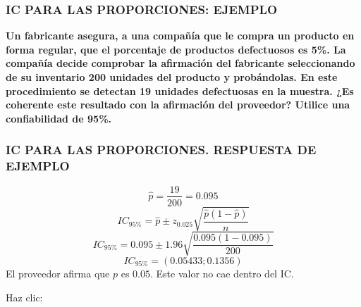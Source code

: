 \documentclass{beamer}
\begin{document}
\begin{frame}
\frametitle{IC PARA LAS PROPORCIONES: EJEMPLO}
\textbf{
Un fabricante asegura, a una compañía que le compra un producto en
forma regular, que el porcentaje de productos defectuosos es 5\%. La compañía decide comprobar la afirmación del
fabricante seleccionando de su inventario 200 unidades del producto
y probándolas. En este procedimiento se detectan 19 unidades
defectuosas en la muestra. ¿Es coherente este resultado con la
afirmación del proveedor? Utilice una confiabilidad de 95\%.
}\end{frame}

\begin{frame}
\frametitle{IC PARA LAS PROPORCIONES. RESPUESTA DE EJEMPLO}

$$\hat{p}=\frac{19}{200}=0.095$$
$$IC_{95\%}=\hat{p}\pm z_{0.025}\sqrt{\frac{\hat{p}(1-\hat{p})}{n}}$$
$$IC_{95\%}=0.095 \pm 1.96 \sqrt{\frac{0.095(1-0.095)}{200}}$$
$$IC_{95\%}=(0.05433;0.1356)$$
El proveedor afirma que $p$ es $0.05$. Este
valor no cae dentro del IC.

      Haz clic: \href{https://colab.research.google.com/drive/14izMe-eFdclOhTeS3hiLE_0h_4E3Jkps?usp=sharing}{}  \href{https://docs.google.com/spreadsheets/d/1xAh-TitIncHH8uwblbpvgjYma7B6gUTWlk8C2z1BquQ/edit?usp=sharing}{}
\end{frame}


\end{document}
